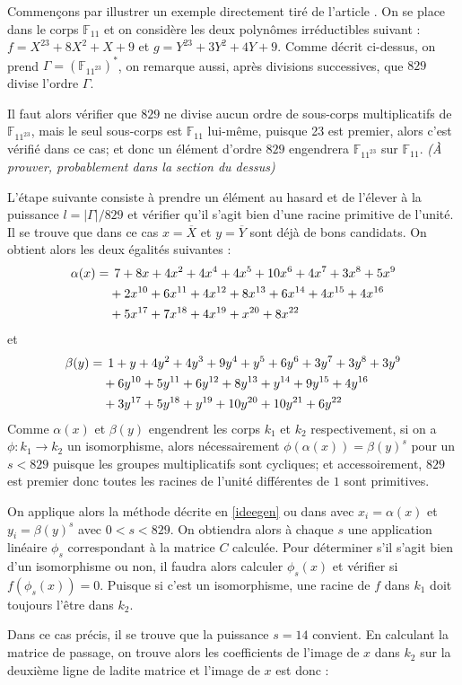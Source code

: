 \documentclass[a4paper]{article} %
\numberwithin{equation}{section}
\begin{document}
\begin{ex}
Commençons par illustrer un exemple directement tiré de l'article \cite{Pin}. On se place dans le corps $\mathbb{F}_{11}$ et on considère les deux polynômes irréductibles suivant : $f = X^{23} + 8X^2 + X + 9$ et $g = Y^{23} + 3Y^2 + 4Y + 9$. Comme décrit ci-dessus, on prend $\Gamma = (\mathbb{F}_{11^{23}})^*$, on remarque aussi, après divisions successives, que $829$ divise l'ordre $\Gamma$.\par
Il faut alors vérifier que $829$ ne divise aucun ordre de sous-corps multiplicatifs de $\mathbb{F}_{11^{23}}$, mais le seul sous-corps est $\mathbb{F}_{11}$ lui-même, puisque 23 est premier, alors c'est vérifié dans ce cas; et donc un élément d'ordre $829$ engendrera $\mathbb{F}_{11^{23}}$ sur $\mathbb{F}_{11}$. \textit{(À prouver, probablement dans la section du dessus)}\par
L'étape suivante consiste à prendre un élément au hasard et de l'élever à la puissance $l = |\Gamma|/829$ et vérifier qu'il s'agit bien d'une racine primitive de l'unité. Il se trouve que dans ce cas $x = \overline{X}$ et $y = \overline{Y}$ sont déjà de bons candidats. On obtient alors les deux égalités suivantes :
\begin{align*}
\alpha(x) =&\hspace{0.15cm} 7 + 8x + 4x^2 + 4x^4 + 4x^5 + 10x^6 + 4x^7 + 3x^8 + 5x^9\\
& + 2x^{10} + 6x^{11} + 4x^{12} + 8x^{13} + 6x^{14} + 4x^{15} + 4x^{16}\\
& + 5x^{17}  + 7x^{18} + 4x^{19} + x^{20} + 8x^{22}
\end{align*}
et
\begin{align*}
\beta(y) =&\hspace{0.15cm}1 + y + 4y^2 + 4y^3 + 9y^4 + y^5 + 6y^6 + 3y^7 + 3y^8 + 3y^9\\
& + 6y^{10} + 5y^{11} + 6y^{12} + 8y^{13} + y^{14} + 9y^{15} + 4y^{16}\\
& + 3y^{17} + 5y^{18} + y^{19} + 10y^{20} + 10y^{21} + 6y^{22}
\end{align*}
Comme $\alpha(x)$ et $\beta(y)$ engendrent les corps $k_1$ et $k_2$ respectivement, si on a $\phi : k_1\to k_2$ un isomorphisme, alors nécessairement $\phi(\alpha(x)) = \beta(y)^s$ pour un $s < 829$ puisque les groupes multiplicatifs sont cycliques; et accessoirement, $829$ est premier donc toutes les racines de l'unité différentes de $1$ sont primitives.\par
On applique alors la méthode décrite en \ref{ideegen} ou dans \cite{Rai} avec $x_i = \alpha(x)$ et $y_i = \beta(y)^s$ avec $0 < s < 829$. On obtiendra alors à chaque $s$ une application linéaire $\phi_s$ correspondant à la matrice $C$ calculée. Pour déterminer s'il s'agit bien d'un isomorphisme ou non, il faudra alors calculer $\phi_s(x)$ et vérifier si $f(\phi_s(x)) = 0$. Puisque si c'est un isomorphisme, une racine de $f$ dans $k_1$ doit toujours l'être dans $k_2$.\par
Dans ce cas précis, il se trouve que la puissance $s = 14$ convient. En calculant la matrice de passage, on trouve alors les coefficients de l'image de $x$ dans $k_2$ sur la deuxième ligne de ladite matrice et l'image de $x$ est donc :


\end{ex}
\end{document}
